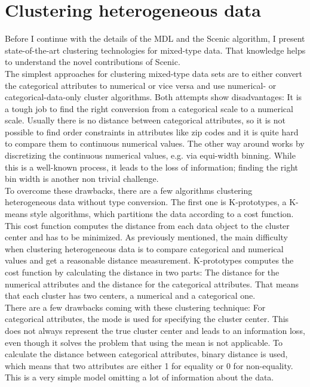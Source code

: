\documentclass[conference]{IEEEtran}
\begin{document}
\section{Clustering heterogeneous data}
Before I continue with the details of the MDL and the Scenic algorithm, I present state-of-the-art clustering technologies for mixed-type data. That knowledge helps to understand the novel contributions of Scenic.
\\
The simplest approaches for clustering mixed-type data sets are to either convert the categorical attributes to numerical or vice versa and use numerical- or categorical-data-only cluster algorithms. Both attempts show disadvantages: It is a tough job to find the right conversion from a categorical scale to a numerical scale. Usually there is no distance between categorical attributes, so it is not possible to find order constraints in attributes like zip codes and it is quite hard to compare them to continuous numerical values. The other way around works by discretizing the continuous numerical values, e.g. via equi-width binning. While this is a well-known process, it leads to the loss of information; finding the right bin width is another non trivial challenge.
\\
To overcome these drawbacks, there are a few algorithms clustering heterogeneous data without type conversion. The first one is K-prototypes\cite{kprototypes}, a K-means style algorithms, which partitions the data according to a cost function. This cost function computes the distance from each data object to the cluster center and has to be minimized. As previously mentioned, the main difficulty when clustering heterogeneous data is to compare categorical and numerical values and get a reasonable distance measurement. K-prototypes computes the cost function by calculating the distance in two parts: The distance for the numerical attributes and the distance for the categorical attributes. That means that each cluster has two centers, a numerical and a categorical one. 
\\
There are a few drawbacks coming with these clustering technique: For categorical attributes, the mode is used for specifying the cluster center. This does not always represent the true cluster center and leads to an information loss, even though it solves the problem that using the mean is not applicable. 
To calculate the distance between categorical attributes, binary distance is used, which means that two attributes are either 1 for equality or 0 for non-equality. This is a very simple model omitting a lot of information about the data.
\end{document}

